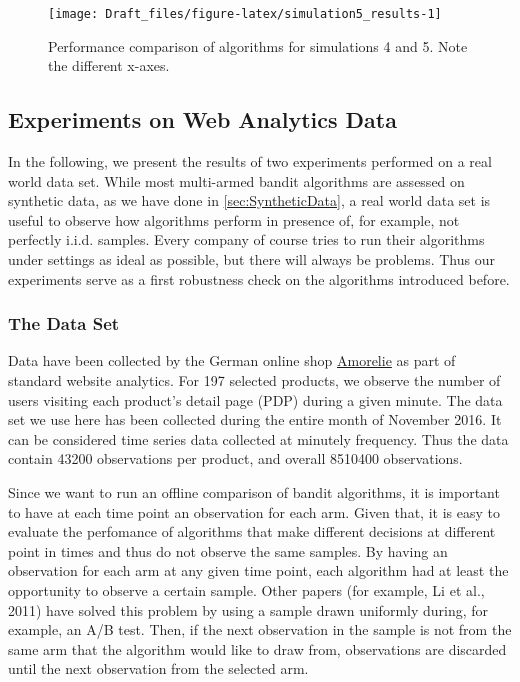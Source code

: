\documentclass[11pt,]{article}
\begin{document}
\begin{figure}

{\centering \texttt{[image: Draft\_files/figure-latex/simulation5\_results-1]} 

}

\caption{Performance comparison of algorithms for simulations 4 and 5. Note the different x-axes.}\label{fig:simulation5_results}
\end{figure}

\subsection{\texorpdfstring{Experiments on Web Analytics Data
\label{sec:RealData}}{Experiments on Web Analytics Data }}\label{experiments-on-web-analytics-data}

In the following, we present the results of two experiments performed on
a real world data set. While most multi-armed bandit algorithms are
assessed on synthetic data, as we have done in
\autoref{sec:SyntheticData}, a real world data set is useful to observe
how algorithms perform in presence of, for example, not perfectly i.i.d.
samples. Every company of course tries to run their algorithms under
settings as ideal as possible, but there will always be problems. Thus
our experiments serve as a first robustness check on the algorithms
introduced before.

\subsubsection{The Data Set}\label{the-data-set}

Data have been collected by the German online shop
\href{https://amorelie.de}{Amorelie} as part of standard website
analytics. For 197 selected products, we observe the number of users
visiting each product's detail page (PDP) during a given minute. The
data set we use here has been collected during the entire month of
November 2016. It can be considered time series data collected at
minutely frequency. Thus the data contain 43200 observations per
product, and overall 8510400 observations.

Since we want to run an offline comparison of bandit algorithms, it is
important to have at each time point an observation for each arm. Given
that, it is easy to evaluate the perfomance of algorithms that make
different decisions at different point in times and thus do not observe
the same samples. By having an observation for each arm at any given
time point, each algorithm had at least the opportunity to observe a
certain sample. Other papers (for example, Li et al., 2011) have solved
this problem by using a sample drawn uniformly during, for example, an
A/B test. Then, if the next observation in the sample is not from the
same arm that the algorithm would like to draw from, observations are
discarded until the next observation from the selected arm.
\end{document}
